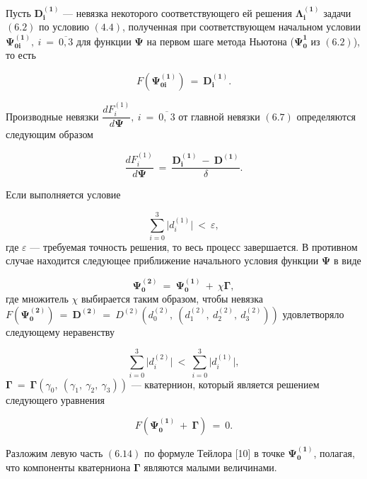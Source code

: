 \documentclass[14pt]{extreport}
\begin{document}
Пусть $\boldsymbol{D_i^{(1)}}$ --- невязка некоторого соответствующего ей решения $\boldsymbol{\Lambda_i^{(1)}}$ задачи $(6.2)$
по условию $(4.4)$, полученная при соответствующем начальном условии $\boldsymbol{\Psi_{0i}^{(1)}},\ i\ =\ \overline{0, 3}$ для функции $\boldsymbol\Psi$ 
на первом шаге метода Ньютона ($\boldsymbol{\Psi_{0}^{1}}$ из $(6.2)$), то есть

\begin{equation}
 F(\boldsymbol{\Psi_{0i}^{(1)}})\ =\ \boldsymbol{D_i^{(1)}}.
\end{equation}

Производные невязки $\dfrac{dF_i^{(1)}}{d\boldsymbol\Psi},\ i\ =\ \overline{0,\ 3}$ от главной невязки  $(6.7)$ определяются следующим образом

\begin{equation}
\dfrac{dF_i^{(1)}}{d\boldsymbol\Psi}\ =\ \dfrac{\boldsymbol{D_i^{(1)}}\ -\ \boldsymbol{D^{(1)}}}{\delta}.
\end{equation}

Если выполняется условие 

\begin{equation}
\sum_{i = 0}^{3}\big|d_i^{(1)}\big|\ <\ \varepsilon,
\end{equation}
где $\varepsilon$ --- требуемая точность решения, то весь процесс завершается. В противном случае находится следующее приближение начального условия
функции $\boldsymbol\Psi$ в виде

\begin{equation}
\boldsymbol{\Psi_{0}^{(2)}}\ =\ \boldsymbol{\Psi_{0}^{(1)}}\ +\ \chi\boldsymbol\Gamma,
\end{equation}
где множитель $\chi$ выбирается таким образом, чтобы невязка $F(\boldsymbol{\Psi_{0}^{(2)}})\ =\ \boldsymbol{D^{(2)}}\ 
=\  D^{(2)}(d_0^{(2)},\ (d_1^{(2)},\ d_2^{(2)},\ d_3^{(2)}))$ 
удовлетворяло следующему неравенству

\begin{equation}
\sum_{i = 0}^{3}\big|d_i^{(2)}\big|\ <\ \sum_{i = 0}^{3}\big|d_i^{(1)}\big|,
\end{equation}
$\boldsymbol\Gamma\ =\ \boldsymbol\Gamma(\gamma_0,\ (\gamma_1,\ \gamma_2,\ \gamma_3))$ --- кватернион, который является решением следующего уравнения

\begin{equation}
F(\boldsymbol{\Psi_{0}^{(1)}}\ +\ \boldsymbol\Gamma)\ =\ 0.
\end{equation}

Разложим левую часть $(6.14)$ по формуле Тейлора [10] в точке $\boldsymbol{\Psi_{0}^{(1)}}$,
полагая, что компоненты кватерниона $\boldsymbol\Gamma$ являются малыми величинами.
\end{document}
